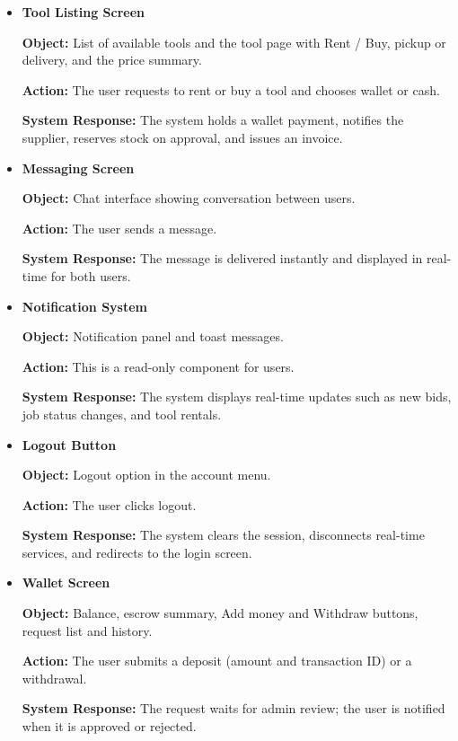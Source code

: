 \documentclass[A4paper,12pt]{report}
\theoremstyle{plain}
\theoremstyle{definition}
\theoremstyle{remark}
\numberwithin{equation}{section}
\begin{document}
\begin{itemize}
\textbf{Action:} The client or technician performs actions such as accepting a bid or updating job status.  

\textbf{System Response:} The system updates the job status and sends real-time notifications to relevant users.

\item \textbf{Tool Listing Screen}  

\textbf{Object:} List of available tools and the tool page with Rent / Buy, pickup or delivery, and the price summary.

\textbf{Action:} The user requests to rent or buy a tool and chooses wallet or cash.

\textbf{System Response:} The system holds a wallet payment, notifies the supplier, reserves stock on approval, and issues an invoice.

\item \textbf{Messaging Screen}  

\textbf{Object:} Chat interface showing conversation between users.  

\textbf{Action:} The user sends a message.  

\textbf{System Response:} The message is delivered instantly and displayed in real-time for both users.

\item \textbf{Notification System}  

\textbf{Object:} Notification panel and toast messages.  

\textbf{Action:} This is a read-only component for users.  

\textbf{System Response:} The system displays real-time updates such as new bids, job status changes, and tool rentals.

\item \textbf{Logout Button}  

\textbf{Object:} Logout option in the account menu.    

\textbf{Action:} The user clicks logout.  

\textbf{System Response:} The system clears the session, disconnects real-time services, and redirects to the login screen.

\item \textbf{Wallet Screen}

\textbf{Object:} Balance, escrow summary, Add money and Withdraw buttons, request list and history.

\textbf{Action:} The user submits a deposit (amount and transaction ID) or a withdrawal.

\textbf{System Response:} The request waits for admin review; the user is notified when it is approved or rejected.

\end{itemize}
\end{document}
